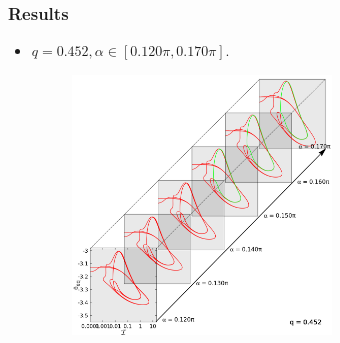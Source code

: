 \documentclass{beamer}
\begin{document}
\begin{frame}
	\frametitle{Results}
	\begin{overlayarea}{\textwidth}{\textheight}
	\begin{itemize}
		\item $q=0.452, \alpha\in [0.120\pi, 0.
		170\pi]$.
		\begin{figure}[htb]
			\begin{center}
				\includegraphics[width=0.65\textwidth]{plots/elastic_beam_I_theta_q_0.452_alpha_restart1.png}
			\end{center}
		\end{figure}
	\end{itemize}
	\end{overlayarea}
\end{frame}

\end{document}

